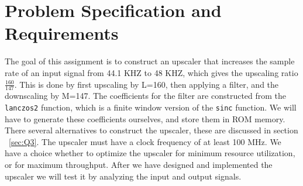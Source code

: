 \section{Problem Specification and Requirements}
The goal of this assignment is to construct an upscaler that increases the sample rate of an input signal from 44.1 KHZ to 48 KHZ, which gives the upscaling ratio $\frac{160}{147}$.  This is done by first upscaling by L=160, then applying a filter, and the downscaling by M=147.  The coefficients for the filter are constructed from the \texttt{lanczos2} function, which is a finite window version of the \texttt{sinc} function. We will have to generate these coefficients ourselves, and store them in ROM memory. There several alternatives to construct the upscaler, these are discussed in section ~\ref{sec:Q3}. The upscaler must have a clock frequency of at least 100 MHz. We have a choice whether to optimize the upscaler for minimum resource utilization, or for maximum throughput. After we have designed and implemented the upscaler we will test it by analyzing the input and output signals.
